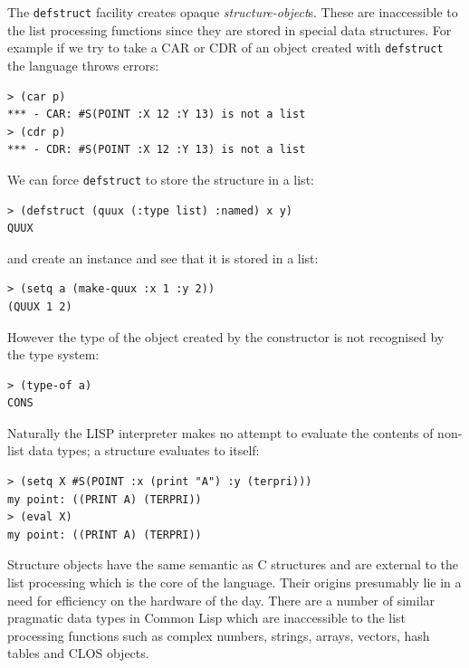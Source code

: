 \documentclass[a4paper,12pt,dvips]{article}
\begin{document}
The \texttt{defstruct} facility creates opaque \textit{structure-object}s. These are inaccessible to the list processing functions since they are stored in special data structures. For example if we try to take a CAR or CDR of an object created with \texttt{defstruct} the language throws errors:  
\begin{verbatim}
> (car p)
*** - CAR: #S(POINT :X 12 :Y 13) is not a list
> (cdr p)
*** - CDR: #S(POINT :X 12 :Y 13) is not a list
\end{verbatim}
We can force \texttt{defstruct} to store the structure in a list:
\begin{verbatim}
> (defstruct (quux (:type list) :named) x y)
QUUX
\end{verbatim}
and create an instance and see that it is stored in a list:
\begin{verbatim}
> (setq a (make-quux :x 1 :y 2))
(QUUX 1 2)
\end{verbatim}
However the type of the object created by the constructor is not recognised by the type system:
\begin{verbatim}
> (type-of a)
CONS
\end{verbatim}
Naturally the LISP interpreter makes no attempt to evaluate the contents of non-list data types; a structure evaluates to itself:
\begin{verbatim}
> (setq X #S(POINT :x (print "A") :y (terpri)))
my point: ((PRINT A) (TERPRI))
> (eval X)
my point: ((PRINT A) (TERPRI))
\end{verbatim}
Structure objects have the same semantic as C structures and are external to the list processing which is the core of the language. Their origins presumably lie in a need for efficiency on the hardware of the day. There are a number of similar pragmatic data types in Common Lisp which are inaccessible to the list processing functions such as complex numbers, strings, arrays, vectors, hash tables and CLOS objects.
%
\end{document}
